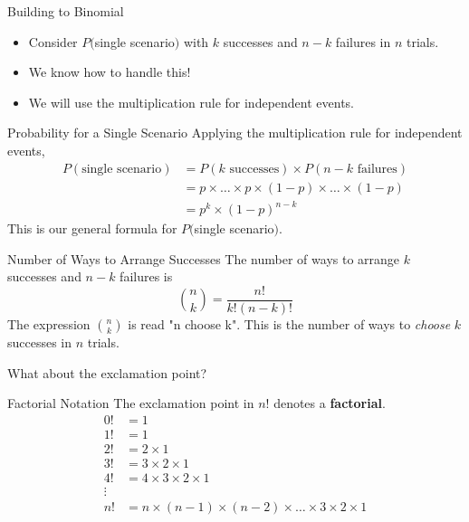 \begin{frame}{Building to Binomial}
    \begin{itemize}
        \item Consider $P ($single scenario$)$ with $k$ successes and $n − k$ failures in $n$ trials.
        \item We know how to handle this! 
        \item We will use the multiplication rule for independent events.
    \end{itemize}
\end{frame}

\begin{frame}{Probability for a Single Scenario}
    Applying the multiplication rule for independent events,
    \begin{align*}
        P(\text{single scenario}) &= P(k\text{ successes})\times P(n-k\text{ failures}) \\
        &= p \times \dots \times p \times (1-p) \times \dots \times (1-p) \\
        &= p^k \times (1 − p)^{n−k}
    \end{align*}
This is our general formula for $P ($single scenario$)$.
\end{frame}

\begin{frame}{Number of Ways to Arrange Successes}
    The number of ways to arrange $k$ successes and $n − k$ failures is
    \[
        {n \choose k} = \frac{n!}{k!(n-k)!}
    \]
    The expression ${n \choose k}$ is read "n choose k". This is the number of ways to \textit{choose} $k$ successes in $n$ trials.
    
    \vspace{18pt}What about the exclamation point?
\end{frame}

\begin{frame}{Factorial Notation}
    The exclamation point in $n!$ denotes a \textbf{factorial}. 
    \begin{align*}
        0! &= 1 \\
        1! &= 1 \\
        2! &= 2 \times 1 \\
        3! &= 3 \times 2 \times 1 \\
        4! &= 4 \times 3 \times 2 \times 1 \\
        \vdots \\
        n! &= n \times (n-1) \times (n-2) \times \dots \times 3 \times 2 \times 1
    \end{align*}
\end{frame}

